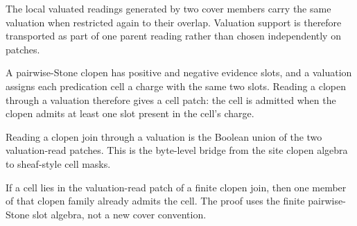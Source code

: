 \begin{theorem}\label{thm:claim-valuated-reading-cover-overlap-valuations}\leanok{}
The local valuated readings generated by two cover members carry the same
valuation when restricted again to their overlap.  Valuation support is therefore
transported as part of one parent reading rather than chosen independently on
patches.
\end{theorem}

\begin{proposition}\label{thm:claim-valuated-reading-clopen-patch}\leanok{}
A pairwise-Stone clopen has positive and negative evidence slots, and a valuation
assigns each predication cell a charge with the same two slots.  Reading a clopen
through a valuation therefore gives a cell patch: the cell is admitted when the
clopen admits at least one slot present in the cell's charge.
\end{proposition}

\begin{theorem}\label{thm:claim-valuated-reading-clopen-patch-join}\leanok{}
Reading a clopen join through a valuation is the Boolean union of the two
valuation-read patches.  This is the byte-level bridge from the site clopen
algebra to sheaf-style cell masks.
\end{theorem}

\begin{theorem}\label{thm:claim-valuated-reading-clopen-patch-joinlist}\leanok{}
If a cell lies in the valuation-read patch of a finite clopen join, then one
member of that clopen family already admits the cell.  The proof uses the finite
pairwise-Stone slot algebra, not a new cover convention.
\end{theorem}

